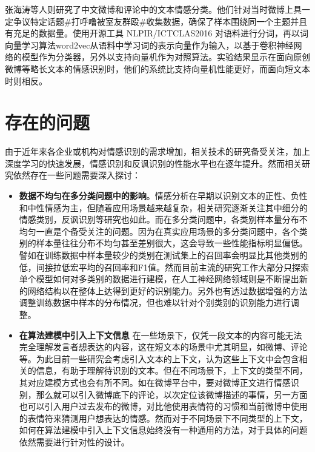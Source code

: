 张海涛等人\cite{zhang2018jiyu}则研究了中文微博和评论中的文本情感分类。他们针对当时微博上具一定争议特定话题\#打呼噜被室友群殴\#收集数据，确保了样本围绕同一个主题并且有充足的数据量。使用开源工具 NLPIR/ICTCLAS2016 对语料进行分词，再以词向量学习算法word2vec从语料中学习词的表示向量作为输入，以基于卷积神经网络的模型作为分类器，另外以支持向量机作为对照算法。实验结果显示在面向原创微博等略长文本的情感识别时，他们的系统比支持向量机性能更好，而面向短文本时则相反。

\section{存在的问题}

由于近年来各企业或机构对情感识别的需求增加，相关技术的研究备受关注，加上深度学习的快速发展，情感识别和反讽识别的性能水平也在逐年提升。然而相关研究依然存在一些问题需要深入探讨：

\begin{itemize}

\item {\bf 数据不均匀在多分类问题中的影响}。情感分析在早期以识别文本的正性、负性和中性情感为主，但随着应用场景越来越复杂，相关研究逐渐关注其中细分的情感类别，反讽识别等研究也如此。而在多分类问题中，各类别样本量分布不均匀一直是个备受关注的问题。因为在真实应用场景的多分类问题中，各个类别的样本量往往分布不均匀甚至差别很大，这会导致一些性能指标明显偏低。譬如在训练数据中样本量较少的类别在测试集上的召回率会明显比其他类别的低，间接拉低宏平均的召回率和F1值。然而目前主流的研究工作大部分只探索单个模型如何对多类别的数据进行建模，在人工神经网络领域则是不断提出新的网络结构以在整体上达得到更好的识别能力。另外也有透过数据增强的方法调整训练数据中样本的分布情况，但也难以针对个别类别的识别能力进行调整。

\item {\bf 在算法建模中引入上下文信息} 在一些场景下，仅凭一段文本的内容可能无法完全理解发言者想表达的内容，这在短文本的场景中尤其明显，如微博、评论等。为此目前一些研究会考虑引入文本的上下文，认为这些上下文中会包含相关的信息，有助于理解待识别的文本。但在不同场景下，上下文的类型不同，其对应建模方式也会有所不同。如在微博平台中，要对微博正文进行情感识别，那么就可以引入微博底下的评论，以次定位该微博描述的事情，另一方面也可以引入用户过去发布的微博，对比他使用表情符的习惯和当前微博中使用的表情符来猜测用户想表达的情感。然而对于不同场景下不同类型的上下文，如何在算法建模中引入上下文信息始终没有一种通用的方法，对于具体的问题依然需要进行针对性的设计。

\end{itemize}

